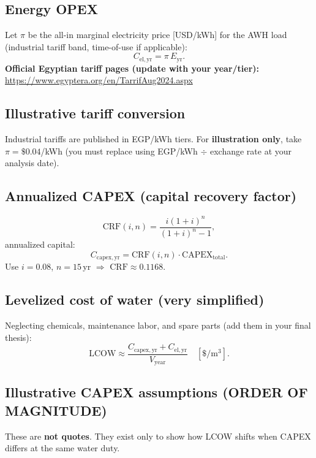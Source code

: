 \documentclass[11pt,a4paper]{article}
\begin{document}
\subsection{Energy OPEX}
Let $\pi$ be the all-in marginal electricity price [USD/kWh] for the AWH load (industrial tariff band, time-of-use if applicable):
\begin{equation}
C_{\mathrm{el,yr}} = \pi\,E_{\mathrm{yr}}.
\end{equation}
\textbf{Official Egyptian tariff pages (update with your year/tier):}\\
\url{https://www.egyptera.org/en/TarrifAug2024.aspx}

\subsection{Illustrative tariff conversion}
Industrial tariffs are published in EGP/kWh tiers. For \textbf{illustration only}, take $\pi=\$0.04$/kWh (you must replace using EGP/kWh $\div$ exchange rate at your analysis date).

\subsection{Annualized CAPEX (capital recovery factor)}
\begin{equation}
\mathrm{CRF}(i,n)=\frac{i(1+i)^n}{(1+i)^n-1},
\end{equation}
annualized capital:
\begin{equation}
C_{\mathrm{capex,yr}}=\mathrm{CRF}(i,n)\cdot \mathrm{CAPEX}_{\mathrm{total}}.
\end{equation}
Use $i=0.08$, $n=15$\,yr $\Rightarrow$ $\mathrm{CRF}\approx 0.1168$.

\subsection{Levelized cost of water (very simplified)}
Neglecting chemicals, maintenance labor, and spare parts (add them in your final thesis):
\begin{equation}
\mathrm{LCOW}\approx \frac{C_{\mathrm{capex,yr}}+C_{\mathrm{el,yr}}}{V_{\mathrm{year}}}\quad[\mathrm{\$/m^3}].
\end{equation}

\subsection{Illustrative CAPEX assumptions (ORDER OF MAGNITUDE)}
These are \textbf{not quotes}. They exist only to show how LCOW shifts when CAPEX differs at the same water duty.
\end{document}
